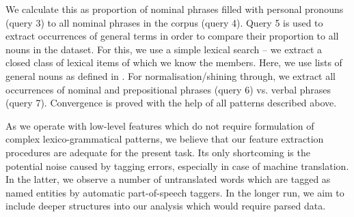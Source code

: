 \documentclass[output=paper]{LSP/langsci}
\begin{document}
\begin{table}[t]
     \centering
 \caption{Queries for feature extraction}
     \label{tab:4.1}
\end{table}

We calculate this as proportion of nominal phrases filled with personal pronouns (query 3) to all nominal phrases in the corpus (query 4). Query 5 is used to extract occurrences of general terms in order to compare their proportion to all nouns in the dataset. For this, we use a simple lexical search – we extract a closed class of lexical items of which we know the members. Here, we use lists of general nouns as defined in \citep{Dipper2012}. For normalisation/shining through, we extract all occurrences of nominal and prepositional phrases (query 6) vs. verbal phrases (query 7). Convergence is proved with the help of all patterns described above.

As we operate with low-level features which do not require formulation of complex lexico-grammatical patterns, we believe that our feature extraction procedures are adequate for the present task. Its only shortcoming is the potential noise caused by tagging errors, especially in case of machine translation. In the latter, we observe a number of untranslated words which are tagged as named entities by automatic part-of-speech taggers. In the longer run, we aim to include deeper structures into our analysis which would require parsed data.
\end{document}
